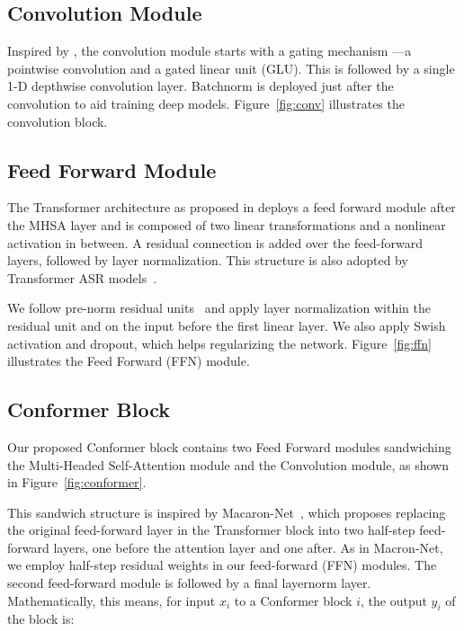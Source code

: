 \label{sec:model:atten:selfatten}

\subsection{Convolution Module} Inspired by \cite{wu2020lite}, the convolution module starts with a gating mechanism \cite{dauphin2017language}---a pointwise convolution and a gated linear unit (GLU). This is followed by a single 1-D depthwise convolution layer. Batchnorm is deployed just after the convolution to aid training deep models. Figure~\ref{fig:conv} illustrates the convolution block.

\subsection{Feed Forward Module}
\label{sec:model:ffn}
The Transformer architecture as proposed in \cite{vaswani2017attention} deploys a feed forward module after the MHSA layer and is composed of two linear transformations and a nonlinear activation in between. A residual connection is added over the feed-forward layers, followed by layer normalization. This structure is also adopted by Transformer ASR models~\cite{zhang2020transformer, dong2018speech}.

We follow pre-norm residual units~\cite{wang-etal-2019-learning-deep, nguyen2019transformers} and apply layer normalization within the residual unit and on the input before the first linear layer. We also apply Swish activation \cite{ramachandran2017searching} and dropout, which helps regularizing the network. Figure~\ref{fig:ffn} illustrates the Feed Forward (FFN) module.

\subsection{Conformer Block}
\label{sec:model:conformer}
Our proposed Conformer block contains two Feed Forward modules sandwiching the Multi-Headed Self-Attention module and the Convolution module, as shown in Figure~\ref{fig:conformer}.

This sandwich structure is inspired by Macaron-Net~\cite{lu2019understanding}, which proposes  replacing the original feed-forward layer in the Transformer block into two half-step feed-forward layers, one before the attention layer and one after. As in Macron-Net, we employ half-step residual weights in our feed-forward (FFN) modules. The second feed-forward module is followed by a final layernorm layer. Mathematically, this means, for input $x_{i}$ to a Conformer block $i$, the output $y_{i}$ of the block is:

